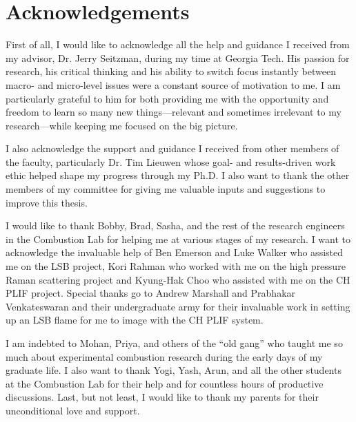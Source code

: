 \chapter*{Acknowledgements}

First of all, I would like to acknowledge all the help and guidance I received from my advisor, Dr. Jerry Seitzman, during my time at Georgia Tech.
His passion for research, his critical thinking and his ability to switch focus instantly between macro- and micro-level issues were a constant source of motivation to me.
I am particularly grateful to him for both providing me with the opportunity and freedom to learn so many new things---relevant and sometimes irrelevant to my research---while keeping me focused on the big picture.

I also acknowledge the support and guidance I received from other members of the faculty, particularly Dr. Tim Lieuwen whose goal- and results-driven work ethic helped shape my progress through my Ph.D.
I also want to thank the other members of my committee for giving me valuable inputs and suggestions to improve this thesis.

I would like to thank Bobby, Brad, Sasha, and the rest of the research engineers in the Combustion Lab for helping me at various stages of my research.
I want to acknowledge the invaluable help of Ben Emerson and Luke Walker who assisted me on the LSB project, Kori Rahman who worked with me on the high pressure Raman scattering project and Kyung-Hak Choo who assisted with me on the CH PLIF project.
Special thanks go to Andrew Marshall and Prabhakar Venkateswaran and their undergraduate army for their invaluable work in setting up an LSB flame for me to image with the CH PLIF system.

I am indebted to Mohan, Priya, and others of the ``old gang'' who taught me so much about experimental combustion research during the early days of my graduate life.
I also want to thank Yogi, Yash, Arun, and all the other students at the Combustion Lab for their help and for countless hours of productive discussions.
Last, but not least, I would like to thank my parents for their unconditional love and support.

